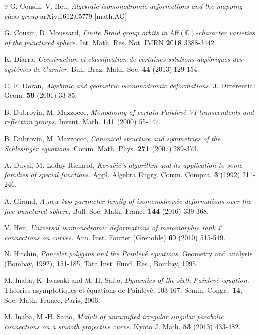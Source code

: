 \documentclass[12]{amsart}
\begin{document}
\begin{thebibliography}{9}
{\sc G. Cousin, V. Heu},
\emph{Algebraic isomonodromic deformations and the mapping class group } 
arXiv:1612.05779 [math.AG]

{\sc G. Cousin, D. Moussard},
\emph{Finite Braid group orbits in $\mathrm{Aff}(\mathbb C)$-character varieties of the punctured sphere.} 
Int. Math. Res. Not. IMRN {\bf 2018} 3388-3442.

{\sc K. Diarra},
\emph{Construction et classification de certaines solutions alg\'ebriques des syst\`emes de Garnier.}
Bull. Braz. Math. Soc. {\bf 44} (2013) 129-154.

{\sc C. F. Doran}, 
\emph{Algebraic and geometric isomonodromic deformations.}
J. Differential Geom. {\bf 59} (2001) 33-85. 

{\sc B. Dubrovin, M. Mazzocco},
\emph{Monodromy of certain Painlev\'e-VI transcendents and reflection groups.} 
Invent. Math. {\bf 141} (2000) 55-147. 

{\sc B.  Dubrovin, M. Mazzocco}, 
\emph{Canonical structure and symmetries of the Schlesinger equations.} 
Comm. Math. Phys. {\bf 271} (2007) 289-373.

{\sc A. Duval, M. Loday-Richaud},
\emph{Kova\v{c}i\v{c}'s algorithm and its application to some families of special functions. }
Appl. Algebra Engrg. Comm. Comput. {\bf 3} (1992) 211-246. 

{\sc A. Girand},
\emph{A new two-parameter family of isomonodromic deformations over the five punctured sphere.} 
Bull. Soc. Math. France {\bf 144} (2016) 339-368.

{\sc V. Heu},
\emph{Universal isomonodromic deformations of meromorphic rank 2 connections on curves.} 
Ann. Inst. Fourier (Grenoble) {\bf 60} (2010) 515-549. 

{\sc N. Hitchin},
\emph{Poncelet polygons and the Painlev\'e equations.} 
Geometry and analysis (Bombay, 1992), 151-185, Tata Inst. Fund. Res., Bombay, 1995. 

{\sc M. Inaba, K. Iwasaki and M.-H. Saito},  
\emph{Dynamics of the sixth Painlev\'e equation.} 
Th\'eories asymptotiques et \'equations de Painlev\'e, 103-167, 
S\'emin. Congr., {\bf 14}, Soc. Math. France, Paris, 2006.

{\sc M. Inaba, M.-H. Saito}, 
\emph{Moduli of unramified irregular singular parabolic connections on a smooth projective curve.} 
Kyoto J. Math. {\bf 53} (2013) 433-482. 


\end{thebibliography}
\end{document}
